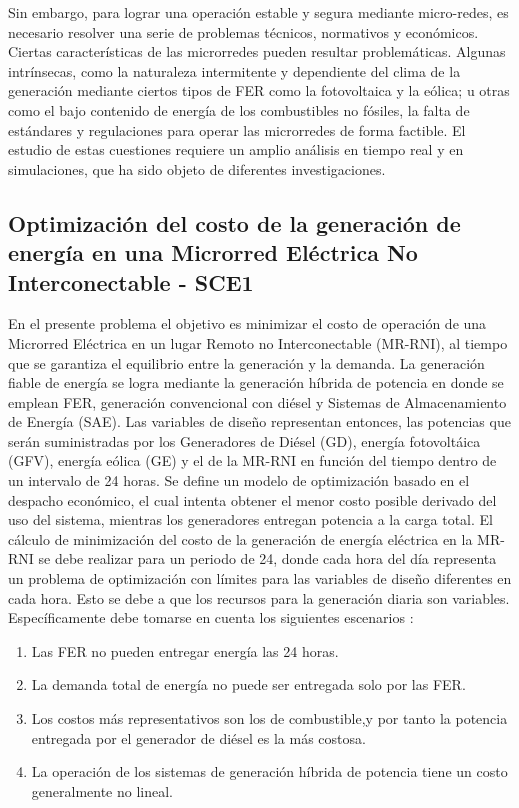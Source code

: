 Sin embargo, para lograr una operación estable y segura mediante micro-redes, es necesario resolver una serie de problemas técnicos, normativos y económicos. Ciertas características de las microrredes pueden resultar problemáticas. Algunas intrínsecas, como la naturaleza intermitente y dependiente del clima de la generación mediante ciertos tipos de FER como la fotovoltaica y la eólica; u otras como el bajo contenido de energía de los combustibles no fósiles, la falta de estándares y regulaciones para operar las microrredes de forma factible. El estudio de estas cuestiones requiere un amplio análisis en tiempo real y en simulaciones, que ha sido objeto de diferentes investigaciones.

 \subsection{Optimización del costo de la generación de energía en una Microrred Eléctrica No Interconectable - SCE1}
En el presente problema el objetivo es minimizar el costo de operación de una  Microrred Eléctrica en un lugar Remoto no Interconectable (MR-RNI), al tiempo que se garantiza el equilibrio entre la generación y la demanda. La generación fiable de energía se logra mediante la generación híbrida de potencia en donde se emplean FER, generación convencional con diésel y Sistemas de Almacenamiento de Energía (SAE). Las variables de diseño representan entonces, las potencias que serán suministradas por los Generadores de Diésel (GD), energía fotovoltáica (GFV), energía eólica (GE) y el  de la MR-RNI en función del tiempo dentro de un intervalo de 24 horas. Se define un modelo de optimización basado en el despacho económico, el cual intenta obtener el menor costo posible derivado del uso del sistema, mientras los generadores entregan potencia a la carga total. El cálculo de minimización del costo de la generación de energía  eléctrica en la MR-RNI se debe realizar para un periodo de 24, donde cada hora del día representa un problema de optimización con límites para las variables de diseño diferentes en cada hora. Esto se debe a que los recursos para la generación diaria son variables. Específicamente debe tomarse en cuenta los siguientes escenarios \cite{zapata_zapata_control_2017}: 
\begin{enumerate}
\item Las FER no pueden entregar energía las 24 horas.
\item La demanda total de energía no puede ser entregada solo por las FER.
\item Los costos más representativos son los de combustible,y por tanto la potencia entregada por el generador de diésel es la más costosa.
\item La operación de los sistemas de generación híbrida de potencia tiene un costo generalmente no lineal.
\end{enumerate}

